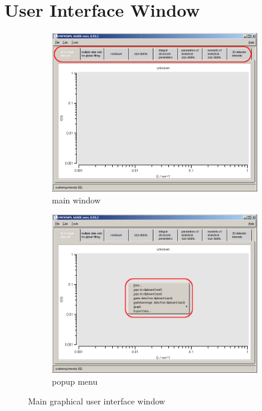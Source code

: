 \section{User Interface Window}
\begin{figure}[htb]
\begin{subfigure}[b]{.48\textwidth}
   \centering
   \includegraphics[width=\textwidth]{QTmainA.png}
   \caption{main window}
   \label{fig:QTmainA}
\end{subfigure}
\hfill
\begin{subfigure}[b]{.48\textwidth}
   \centering
   \includegraphics[width=\textwidth]{QTmainB.png}
   \caption{popup menu}
   \label{fig:QTmainB}
\end{subfigure}
\caption{Main \SASfit graphical user interface window}
\label{fig:QTmain}
\end{figure}

